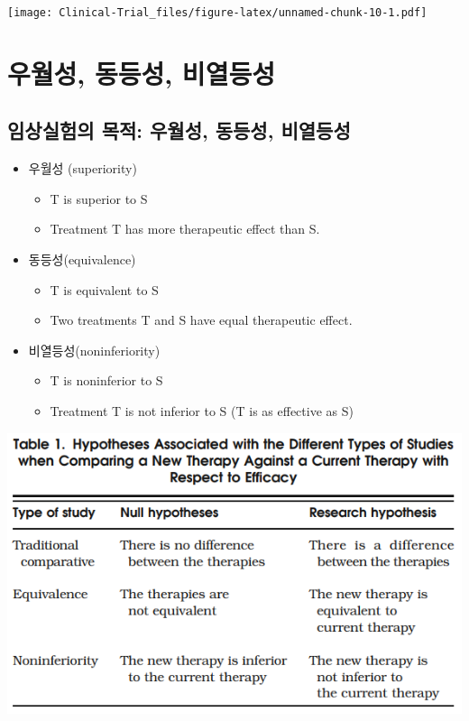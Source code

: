 \documentclass[
]{book}
\providecommand{\tightlist}{%
  \setlength{\itemsep}{0pt}\setlength{\parskip}{0pt}}
\begin{document}
\texttt{[image: Clinical-Trial\_files/figure-latex/unnamed-chunk-10-1.pdf]}

\hypertarget{designtype}{%
\chapter{우월성, 동등성, 비열등성}\label{designtype}}

\hypertarget{uxc784uxc0c1uxc2e4uxd5d8uxc758-uxbaa9uxc801-uxc6b0uxc6d4uxc131-uxb3d9uxb4f1uxc131-uxbe44uxc5f4uxb4f1uxc131}{%
\section{임상실험의 목적: 우월성, 동등성, 비열등성}\label{uxc784uxc0c1uxc2e4uxd5d8uxc758-uxbaa9uxc801-uxc6b0uxc6d4uxc131-uxb3d9uxb4f1uxc131-uxbe44uxc5f4uxb4f1uxc131}}

\begin{itemize}
\tightlist
\item
  우월성 (superiority)

  \begin{itemize}
  \tightlist
  \item
    T is superior to S
  \item
    Treatment T has more therapeutic effect than S.
  \end{itemize}
\item
  동등성(equivalence)

  \begin{itemize}
  \tightlist
  \item
    T is equivalent to S
  \item
    Two treatments T and S have equal therapeutic effect.
  \end{itemize}
\item
  비열등성(noninferiority)

  \begin{itemize}
  \tightlist
  \item
    T is noninferior to S
  \item
    Treatment T is not inferior to S (T is as effective as S)
  \end{itemize}
\end{itemize}

\includegraphics{equiv-meaning.png}
\end{document}
